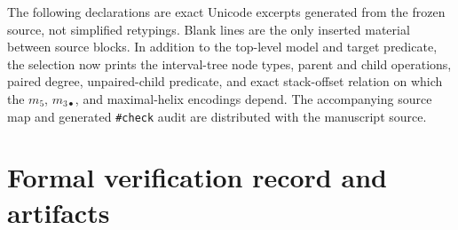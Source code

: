 \documentclass[11pt]{article}
\begin{document}
The following declarations are exact Unicode excerpts generated from the frozen source, not simplified retypings.  Blank lines are the only inserted material between source blocks.  In addition to the top-level model and target predicate, the selection now prints the interval-tree node types, parent and child operations, paired degree, unpaired-child predicate, and exact stack-offset relation on which the $m_5$, $m_{3\bullet}$, and maximal-helix encodings depend.  The accompanying source map and generated \texttt{\#check} audit are distributed with the manuscript source.





\section{Formal verification record and artifacts}
\label{app:artifacts}
\end{document}
